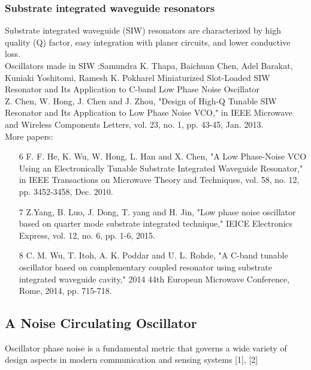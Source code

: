 \subsubsection*{Substrate integrated waveguide resonators}
Substrate integrated waveguide (SIW) resonators are characterized by high quality (Q) factor, easy integration with planer circuits, and lower conductive loss. \\

Oscillators made in SIW :Samundra K. Thapa, Baichuan Chen, Adel Barakat, Kuniaki Yoshitomi, Ramesh K. Pokharel Miniaturized Slot-Loaded SIW Resonator and Its Application to C-band Low Phase Noise Oscillator \\

Z. Chen, W. Hong, J. Chen and J. Zhou, "Design of High-Q Tunable SIW Resonator and Its Application to Low Phase Noise VCO," in IEEE Microwave and Wireless Components Letters, vol. 23, no. 1, pp. 43-45, Jan. 2013. \\

More papers:
\begin{itemize}

	\item[6] F. F. He, K. Wu, W. Hong, L. Han and X. Chen, "A Low Phase-Noise VCO Using an Electronically Tunable Substrate Integrated Waveguide Resonator," in IEEE Transactions on Microwave Theory and Techniques, vol. 58, no. 12, pp. 3452-3458, Dec. 2010.
	\item[7] Z.Yang, B. Luo, J. Dong, T. yang and H. Jin, "Low phase noise oscillator based on quarter mode substrate integrated technique," IEICE Electronics Express, vol. 12, no. 6, pp. 1-6, 2015. 
	\item[8] C. M. Wu, T. Itoh, A. K. Poddar and U. L. Rohde, "A C-band tunable oscillator based on complementary coupled resonator using substrate integrated waveguide cavity," 2014 44th European Microwave Conference, Rome, 2014, pp. 715-718.

\end{itemize}





\subsection{A Noise Circulating Oscillator}

Oscillator phase noise is a fundamental metric that governs a wide variety of design aspects in modern communication and sensing systems [1], [2]

